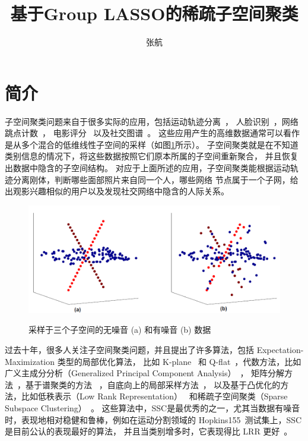\documentclass{ctexart}
\begin{document}
\title{基于Group LASSO的稀疏子空间聚类}
\author{张航}
\maketitle

\section{简介}

子空间聚类问题来自于很多实际的应用，包括运动轨迹分离~\cite{costeira1998motion_seg}，
人脸识别~\cite{basri2003lambertianface}，网络跳点计数~\cite{eriksson2011high_rankMC}，
电影评分~\cite{zhang2012RecSys} 以及社交图谱~\cite{xu2011graphclustering}。
这些应用产生的高维数据通常可以看作是从多个混合的低维线性子空间的采样（如图\ref{fig:Union_of_sub_model}所示）。
子空间聚类就是在不知道类别信息的情况下，将这些数据按照它们原本所属的子空间重新聚合，
并且恢复出数据中隐含的子空间结构。
对应于上面所述的应用，子空间聚类能根据运动轨迹分离刚体，判断哪些面部照片来自同一个人，哪些网络
节点属于一个子网，给出观影兴趣相似的用户以及发现社交网络中隐含的人际关系。

\begin{figure}
  \centering
  \includegraphics[width=0.8\linewidth]{pics/Union_of_Subspace.png}\\
  \caption{采样于三个子空间的无噪音 (a) 和有噪音 (b) 数据}\label{fig:Union_of_sub_model}
\end{figure}

过去十年，很多人关注子空间聚类问题，并且提出了许多算法，包括 Expectation-Maximization 类型的局部优化算法，
比如 K-plane~\cite{bradley2000k-plane} 和 Q-flat~\cite{tseng2000qflat}，代数方法，比如
广义主成分分析（Generalized Principal Component Analysis）~\cite{vidal2005gpca}，
矩阵分解方法~\cite{costeira1998motion_seg,costeira2000multibody_factorization}，基于谱聚类的方法
~\cite{lauer2009spectral,chen2009spectral}，自底向上的局部采样方法~\cite{yan2006LSA,rao2008motion}，
以及基于凸优化的方法，比如低秩表示（Low Rank Representation）~\cite{liu2010lrr_icml,liu2013LRR}
和稀疏子空间聚类（Sparse Subspace Clustering）~\cite{elhamifar2009ssc,elhamifar2012ssc_journal}。
这些算法中，SSC是最优秀的之一，尤其当数据有噪音时，表现地相对稳健和鲁棒，例如在运动分割领域的
Hopkins155~\cite{tron2007benchmark,elhamifar2009ssc}测试集上，SSC是目前公认的表现最好的算法，
并且当类别增多时，它表现得比 LRR 更好~\cite{elhamifar2012ssc_journal}。
\end{document}
